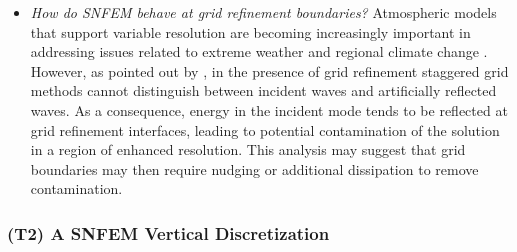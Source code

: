 \documentclass[11pt]{article}
\begin{document}
\begin{itemize}
\item \textit{How do SNFEM behave at grid refinement boundaries?}  Atmospheric models that support variable resolution are becoming increasingly important in addressing issues related to extreme weather and regional climate change \cite{skamarock2012mpas}.  However, as pointed out by \cite{ullrich2011analysis}, in the presence of grid refinement staggered grid methods cannot distinguish between incident waves and artificially reflected waves.  As a consequence, energy in the incident mode tends to be reflected at grid refinement interfaces, leading to potential contamination of the solution in a region of enhanced resolution.  This analysis may suggest that grid boundaries may then require nudging or additional dissipation to remove contamination.
\end{itemize}

\vspace{-0.4cm}
\subsubsection{(T2) A SNFEM Vertical Discretization} \label{sec:VerticalSNFEM}

\end{document}
